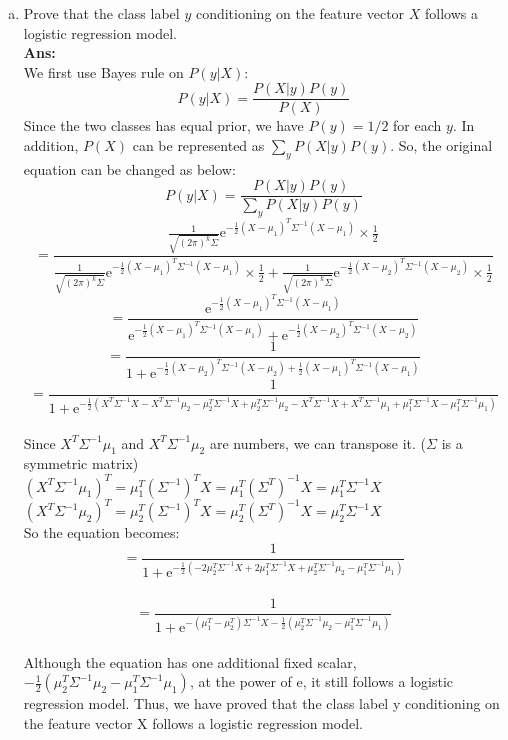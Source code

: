 \documentclass[11pt]{article}
\begin{document}
\begin{enumerate}[(a)]
\item Prove that the class label $y$ conditioning on the feature vector $X$ follows a logistic regression model.\\
\textbf{Ans:}\\
We first use Bayes rule on $P(y|X)$:
$$P(y | X) = \frac{P(X | y)P(y)}{P(X)}$$
Since the two classes has equal prior, we have $P(y) = 1/2$ for each $y$.  In addition, $P(X)$ can be represented as $\sum_{y}P(X|y)P(y)$. So, the original equation can be changed as below:\\

$$P(y|X) = \frac{P(X | y)P(y)}{\sum_{y}P(X|y)P(y)}$$
%
$$= \frac{\frac{1}{\sqrt{(2\pi)^k\Sigma}}\mathrm{e}^{-\frac{1}{2}(X-\mu_1)^T\Sigma^{-1}(X-\mu_1)} \times \frac{1}{2}}
{\frac{1}{\sqrt{(2\pi)^k\Sigma}}\mathrm{e}^{-\frac{1}{2}(X-\mu_1)^T\Sigma^{-1}(X-\mu_1)}\times \frac{1}{2} + 
 \frac{1}{\sqrt{(2\pi)^k\Sigma}}\mathrm{e}^{-\frac{1}{2}(X-\mu_2)^T\Sigma^{-1}(X-\mu_2)}\times \frac{1}{2}}$$
%
$$=\frac{\mathrm{e}^{-\frac{1}{2}(X-\mu_1)^T\Sigma^{-1}(X-\mu_1)}}
{\mathrm{e}^{-\frac{1}{2}(X-\mu_1)^T\Sigma^{-1}(X-\mu_1)} + 
\mathrm{e}^{-\frac{1}{2}(X-\mu_2)^T\Sigma^{-1}(X-\mu_2)}}$$
%
$$=\frac{1}{1+\mathrm{e}^{-\frac{1}{2}(X-\mu_2)^T\Sigma^{-1}(X-\mu_2) + \frac{1}{2}(X-\mu_1)^T\Sigma^{-1}(X-\mu_1)}}$$
%
$$=\frac{1}{1+\mathrm{e}^{ -\frac{1}{2}
(X^T\Sigma^{-1}X 
- X^T\Sigma^{-1}\mu_2 
- \mu_2^T\Sigma^{-1}X 
+ \mu_2^T\Sigma^{-1}\mu_2 
- X^T\Sigma^{-1}X
+X^T\Sigma^{-1}\mu_1
+\mu_1^T\Sigma^{-1}X
- \mu_1^T\Sigma^{-1}\mu_1    )}}$$\\
%
Since $X^T\Sigma^{-1}\mu_1$ and $X^T\Sigma^{-1}\mu_2$ are numbers, we can transpose it. ($\Sigma$ is a symmetric matrix)\\
$(X^T\Sigma^{-1}\mu_1)^T = \mu_1^T(\Sigma^{-1})^TX = \mu_1^T(\Sigma^T)^{-1}X = \mu_1^T\Sigma^{-1}X$\\
$(X^T\Sigma^{-1}\mu_2)^T = \mu_2^T(\Sigma^{-1})^TX = \mu_2^T(\Sigma^T)^{-1}X = \mu_2^T\Sigma^{-1}X$\\
%
So the equation becomes:\\
$$=\frac{1}{1+\mathrm{e}^{ -\frac{1}{2}(
-2\mu_2^T\Sigma^{-1}X + 2\mu_1^T\Sigma^{-1}X
+ \mu_2^T\Sigma^{-1}\mu_2
- \mu_1^T\Sigma^{-1}\mu_1
 )}}$$\\
 $$=\frac{1}{1+\mathrm{e}^{ 
 -(\mu_1^T-\mu_2^T)\Sigma^{-1}X
 - \frac{1}{2}( \mu_2^T\Sigma^{-1}\mu_2
- \mu_1^T\Sigma^{-1}\mu_1)
 }}$$\\
Although the equation has one additional fixed scalar, $- \frac{1}{2}( \mu_2^T\Sigma^{-1}\mu_2 - \mu_1^T\Sigma^{-1}\mu_1)$, at the power of  $\mathrm{e}$, it still follows a logistic regression model. Thus, we have proved that the class label y conditioning on the feature vector X follows a logistic regression model.


\end{enumerate}
\end{document}
